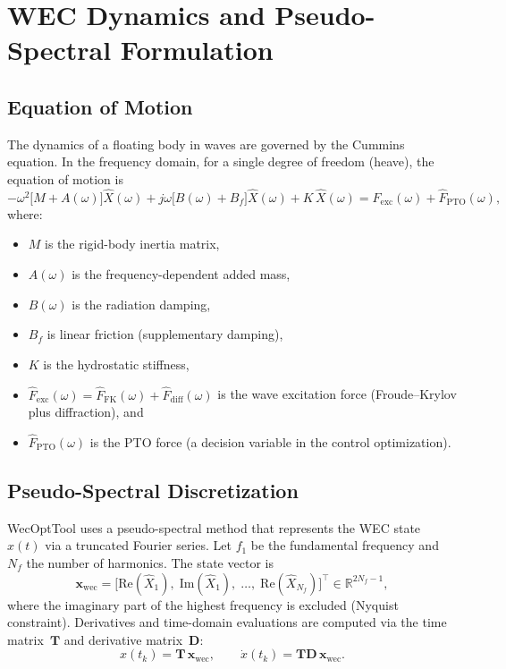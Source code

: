 \documentclass[11pt,a4paper]{article}
\newcommand{\R}{\mathbb{R}}
\newcommand{\xwec}{\bm{x}_{\mathrm{wec}}}
\begin{document}
\section{WEC Dynamics and Pseudo-Spectral Formulation}
\label{sec:dynamics}

\subsection{Equation of Motion}

The dynamics of a floating body in waves are governed by the
Cummins equation.  In the frequency domain, for a single degree of
freedom (heave), the equation of motion is
\begin{equation}
\label{eq:eom_freq}
    -\omega^2 \bigl[M + A(\omega)\bigr]\hat{X}(\omega)
    + j\omega \bigl[B(\omega) + B_f\bigr]\hat{X}(\omega)
    + K\,\hat{X}(\omega)
    = \hat{F}_{\mathrm{exc}}(\omega) + \hat{F}_{\mathrm{PTO}}(\omega),
\end{equation}
where:
\begin{itemize}
    \item $M$ is the rigid-body inertia matrix,
    \item $A(\omega)$ is the frequency-dependent added mass,
    \item $B(\omega)$ is the radiation damping,
    \item $B_f$ is linear friction (supplementary damping),
    \item $K$ is the hydrostatic stiffness,
    \item $\hat{F}_{\mathrm{exc}}(\omega)
          = \hat{F}_{\mathrm{FK}}(\omega) + \hat{F}_{\mathrm{diff}}(\omega)$
          is the wave excitation force
          (Froude--Krylov plus diffraction), and
    \item $\hat{F}_{\mathrm{PTO}}(\omega)$ is the PTO force
          (a decision variable in the control optimization).
\end{itemize}

\subsection{Pseudo-Spectral Discretization}

WecOptTool uses a pseudo-spectral method that represents the WEC
state~$x(t)$ via a truncated Fourier series.  Let $f_1$ be the
fundamental frequency and $N_f$ the number of harmonics.  The state
vector is
\begin{equation}
    \xwec = \bigl[\mathrm{Re}(\hat{X}_1),\;\mathrm{Im}(\hat{X}_1),\;
    \ldots,\;\mathrm{Re}(\hat{X}_{N_f})\bigr]^\top
    \in \R^{2N_f - 1},
\end{equation}
where the imaginary part of the highest frequency is excluded
(Nyquist constraint).  Derivatives and time-domain evaluations are
computed via the time matrix~$\bm{T}$ and derivative
matrix~$\bm{D}$:
\begin{equation}
    x(t_k) = \bm{T}\,\xwec, \qquad
    \dot{x}(t_k) = \bm{T}\bm{D}\,\xwec.
\end{equation}
\end{document}
